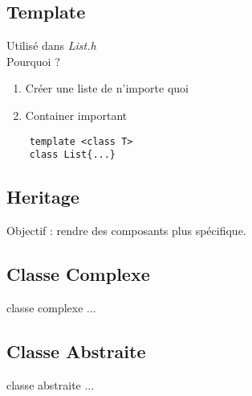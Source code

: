 \documentclass[10pt]{beamer}
\begin{document}
\subsection{Template}
\begin{frame}
  Utilisé dans \emph{List.h}\\

  Pourquoi ?
  \begin{enumerate}
    \item Créer une liste de n'importe quoi
    \item Container important
  \end{enumerate}
\end{frame}
\begin{frame}[fragile]
  \begin{verbatim}
    template <class T>
    class List{...}
  \end{verbatim}
\end{frame}
    \subsection{Heritage}
      \begin{frame}
        Objectif : rendre des composants plus spécifique.


      \end{frame}
    \subsection{Classe Complexe}
      \begin{frame}
        classe complexe ...
      \end{frame}
    \subsection{Classe Abstraite}
      \begin{frame}
        classe abstraite ...
      \end{frame}
\end{document}

